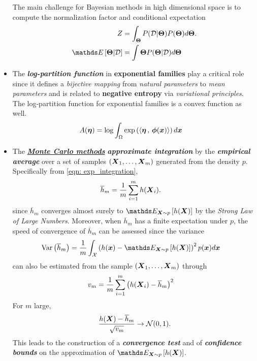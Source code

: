 \documentclass[11pt]{article}
\begin{document}
\begin{itemize}
The main challenge for Bayesian methods in high dimensional space is to compute the normalization factor and conditional expectation
\begin{align*}
Z &= \int_{\mb{\Theta}} P(\cD | \mb{\Theta}) P(\mb{\Theta}) d \mb{\Theta}. \\
\E{}{\mb{\Theta} | \cD} &= \int \mb{\Theta} P(\mb{\Theta} | \cD)  d\mb{\Theta}
\end{align*}

\item The \textbf{\emph{log-partition function}} in \textbf{exponential families} play a critical role since it defines a \emph{bijective mapping} from \emph{natural parameters} to \emph{mean parameters} and is related to \textbf{negative entropy} via \emph{variational principles}. The log-partition function for exponential families is a convex function as well.
\begin{align*}
A(\boldsymbol{\eta}) &= \log \int_{\Omega}\exp\left(\left\langle \boldsymbol{\eta}\,,\, \boldsymbol{\phi}(\boldsymbol{x}) \right\rangle\right)d\boldsymbol{x}
\end{align*}

\item The \underline{\emph{\textbf{Monte Carlo methods}}} \emph{\textbf{approximate integration}} by the \emph{\textbf{empirical average}} over a set of samples $(\boldsymbol{X}_1, \ldots , \boldsymbol{X}_m)$ generated from the density $p$. Specifically from \eqref{eqn: exp_integration}, 
\begin{align}
\overline{h}_{m} &= \frac{1}{m}\sum_{i=1}^{m}h(\boldsymbol{X}_{i}) \label{eqn: exp_integration_monte_carlo}.
\end{align} since $\overline{h}_{m}$ converges almost surely to $\E{\mb{X}\sim p}{h(\mb{X})}$ by the \emph{Strong Law of Large Numbers}. Moreover, when $\overline{h}_{m}$ has a finite expectation under $p$, the speed of convergence of $\overline{h}_{m}$ can be assessed since the variance 
\begin{align*}
\text{Var}\paren{\overline{h}_{m}} &= \frac{1}{m}\int_{\cX}\paren{h(\mb{x}) - \E{\mb{X}\sim p}{h(\mb{X})}}^{2}p(\mb{x}) d\mb{x}
\end{align*} can also be estimated from the sample $(\boldsymbol{X}_1, \ldots , \boldsymbol{X}_m)$ through
\begin{align*}
v_{m} &= \frac{1}{m}\sum_{i=1}^{m}\left(h(\boldsymbol{X}_{i}) - \overline{h}_{m}\right)^2
\end{align*}
For $m$ large,
\begin{align*}
\frac{h(\boldsymbol{X}) - \overline{h}_{m}}{\sqrt{v_{m}}} \rightarrow {\mathcal N}(0, 1).
\end{align*} This leads to the construction of a \emph{\textbf{convergence test}} and of \emph{\textbf{confidence bounds}} on the approximation of $\E{\mb{X}\sim p}{h(\mb{X})}$.
\end{itemize}
\end{document}
